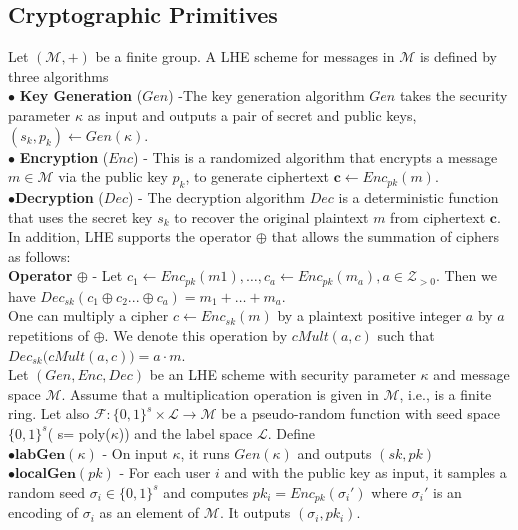 \subsection{Cryptographic Primitives}
Let $(\mathcal{M}, +)$ be a finite group. A \textsf{LHE} scheme
for messages in $\mathcal{M}$ is defined  by three algorithms \\
$\bullet$ \textbf{Key Generation }($Gen$) -The key generation algorithm $Gen$ takes the security parameter $\kappa$ as input and outputs
a pair of secret and public keys, $(s_k, p_k) \leftarrow Gen(\kappa)$.\\
$\bullet$ \textbf{Encryption} ($Enc$) - This is a randomized algorithm that encrypts a message $m \in \mathcal{M}$ via the public key $p_k$, to generate ciphertext $\mathbf{c} \leftarrow Enc_{pk}(m)$.\\
$\bullet$\textbf{Decryption} ($Dec$) - The decryption algorithm $Dec$ is a deterministic function that uses the secret key $s_k$ to
recover the original plaintext $m$ from ciphertext $\mathbf{c}$.
\\
In addition, \textsf{LHE} supports the operator $\oplus$ that allows the summation of ciphers as follows:
\\ \textbf{Operator} $\oplus$ - Let $c_1 \leftarrow Enc_{pk}(m1), \ldots, c_a \leftarrow Enc_{pk}(m_a), a \in \mathcal{Z}_{>0}$. Then we have  $Dec_{sk}(c_1\oplus c_2 ...\oplus c_a)=    m_1 + \ldots   + m_a$.  \\
One can multiply a cipher $c\leftarrow  Enc_{sk}(m)$ by a plaintext positive integer $a$ by $a$ repetitions of $\oplus$. We denote this operation by $cMult(a,c)$ such that $Dec_{sk}\big(cMult(a,c)\big)=a\cdot m$.\\
Let $(Gen,Enc,Dec)$ be an \textsf{LHE} scheme with security parameter $\kappa$ and message space $\mathcal{M}$. Assume that a multiplication operation is given in $\mathcal{M}$, i.e., is a finite ring. Let also $\mathcal{F}:\{0,1\}^s \times \mathcal{L}\rightarrow \mathcal{M}$ be a pseudo-random function with seed space $\{0,1\}^s$( s= poly($\kappa $)) and the label space $\mathcal{L}$. Define
\\
 $\bullet \textbf{labGen}(\kappa)$ - On input $\kappa$, it runs $Gen(\kappa)$ and outputs $(sk,pk)$
\\$\bullet \textbf{localGen}(pk)$ -  For each user $i$ and with the public key as input, it samples a random seed $\sigma_i \in \{0,1\}^s$ and computes $pk_i = Enc_{pk}(\sigma_i')$ where $\sigma_i'$ is an  encoding of $\sigma_i$ as an  element of $\mathcal{M}$. It outputs $(\sigma_i,pk_i)$.\\
